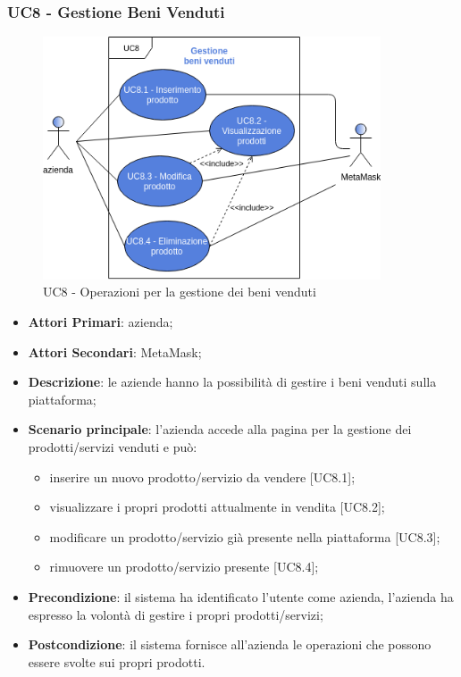 \subsubsection{UC8 - Gestione Beni Venduti}
\begin{figure}[h]
	\includegraphics[width=10cm]{res/images/UC8-Generale.png}
	\centering
	\caption{UC8 - Operazioni per la gestione dei beni venduti}
\end{figure}
\begin{itemize}
	\item \textbf{Attori Primari}: azienda;
	\item \textbf{Attori Secondari}: MetaMask\glo;
	\item \textbf{Descrizione}: le aziende hanno la possibilità di gestire i beni venduti sulla piattaforma;
	\item \textbf{Scenario principale}: l'azienda accede alla pagina per la gestione dei prodotti/servizi venduti e può:
	\begin{itemize}
		\item inserire un nuovo prodotto/servizio da vendere [UC8.1];
		\item visualizzare i propri prodotti attualmente in vendita [UC8.2];
		\item modificare un prodotto/servizio già presente nella piattaforma [UC8.3];
		\item rimuovere un prodotto/servizio presente [UC8.4]; 
	\end{itemize}
	\item \textbf{Precondizione}: il sistema ha identificato l'utente come azienda, l'azienda ha espresso la volontà di gestire i propri prodotti/servizi;
	\item \textbf{Postcondizione}: il sistema fornisce all'azienda le operazioni che possono essere svolte sui propri prodotti.	
\end{itemize}

